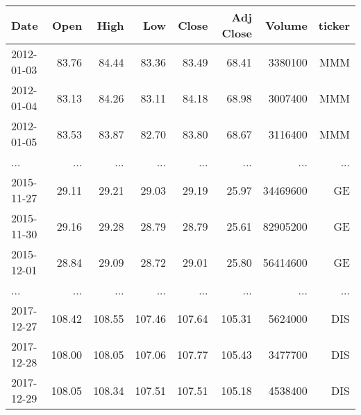 \begin{tabular}{lrrrrrrr}
\toprule
Date &    Open &    High &     Low &   Close &  Adj Close &    Volume & ticker \\
\midrule
2012-01-03 &   83.76 &   84.44 &   83.36 &   83.49 &      68.41 &   3380100 & MMM\\
2012-01-04 &   83.13 &   84.26 &   83.11 &   84.18 &      68.98 &   3007400 & MMM \\
2012-01-05 &   83.53 &   83.87 &   82.70 &   83.80 &      68.67 &   3116400 & MMM \\
...        &   ...   &   ...   &   ...   &   ...   &      ...   &   ...     & ... \\
2015-11-27 &   29.11 &   29.21 &   29.03 &   29.19 &      25.97 &  34469600 & GE \\
2015-11-30 &   29.16 &   29.28 &   28.79 &   28.79 &      25.61 &  82905200 & GE \\
2015-12-01 &   28.84 &   29.09 &   28.72 &   29.01 &      25.80 &  56414600 & GE \\
...        &   ...   &   ...   &   ...   &   ...   &      ...   &   ...     & ... \\
2017-12-27 &  108.42 &  108.55 &  107.46 &  107.64 &     105.31 &   5624000 & DIS \\
2017-12-28 &  108.00 &  108.05 &  107.06 &  107.77 &     105.43 &   3477700 & DIS \\
2017-12-29 &  108.05 &  108.34 &  107.51 &  107.51 &     105.18 &   4538400 & DIS \\
\bottomrule
\end{tabular}
